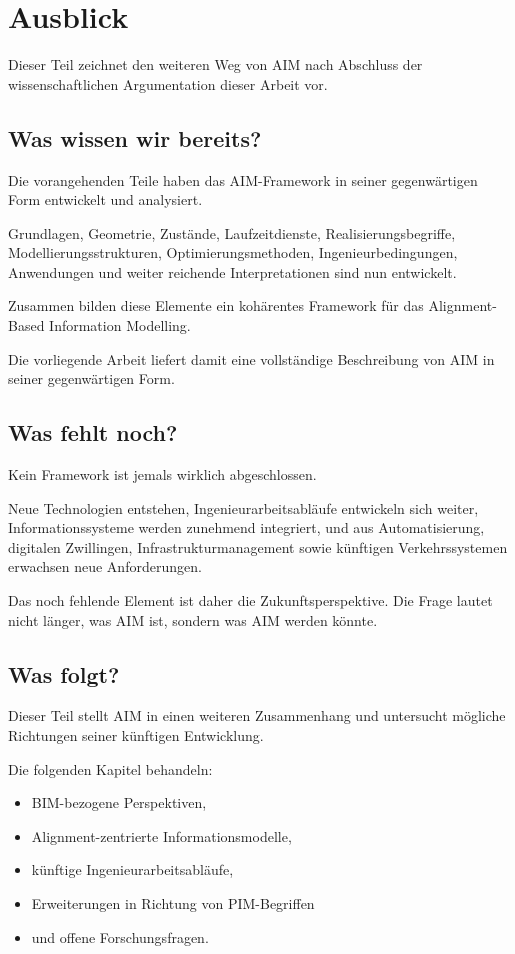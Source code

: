 \chapter*{Ausblick}
{}

Dieser Teil zeichnet den weiteren Weg von AIM nach Abschluss der
wissenschaftlichen Argumentation dieser Arbeit vor.

\section*{Was wissen wir bereits?}

Die vorangehenden Teile haben das AIM-Framework in seiner gegenwärtigen
Form entwickelt und analysiert.

Grundlagen, Geometrie, Zustände, Laufzeitdienste, Realisierungsbegriffe,
Modellierungsstrukturen, Optimierungsmethoden, Ingenieurbedingungen,
Anwendungen und weiter reichende Interpretationen sind nun entwickelt.

Zusammen bilden diese Elemente ein kohärentes Framework für das
Alignment-Based Information Modelling.

Die vorliegende Arbeit liefert damit eine vollständige Beschreibung von
AIM in seiner gegenwärtigen Form.

\section*{Was fehlt noch?}

Kein Framework ist jemals wirklich abgeschlossen.

Neue Technologien entstehen, Ingenieurarbeitsabläufe entwickeln sich
weiter, Informationssysteme werden zunehmend integriert, und aus
Automatisierung, digitalen Zwillingen, Infrastrukturmanagement sowie
künftigen Verkehrssystemen erwachsen neue Anforderungen.

Das noch fehlende Element ist daher die Zukunftsperspektive. Die Frage
lautet nicht länger, was AIM ist, sondern was AIM werden könnte.

\section*{Was folgt?}

Dieser Teil stellt AIM in einen weiteren Zusammenhang und untersucht
mögliche Richtungen seiner künftigen Entwicklung.

Die folgenden Kapitel behandeln:
\begin{itemize}
\item BIM-bezogene Perspektiven,
\item Alignment-zentrierte Informationsmodelle,
\item künftige Ingenieurarbeitsabläufe,
\item Erweiterungen in Richtung von PIM-Begriffen
\item und offene Forschungsfragen.
\end{itemize}

